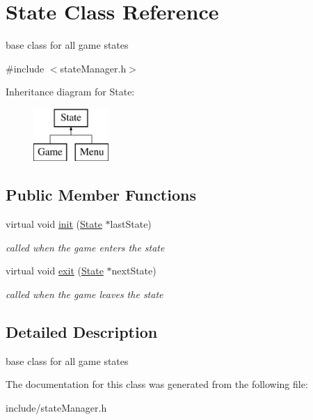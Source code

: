 \hypertarget{classState}{
\section{\-State \-Class \-Reference}
\label{d7/d97/classState}
}


base class for all game states  




{\ttfamily \#include $<$state\-Manager.\-h$>$}

\-Inheritance diagram for \-State\-:\begin{figure}[H]
\begin{center}
\leavevmode
\includegraphics[height=2.000000cm]{d7/d97/classState}
\end{center}
\end{figure}
\subsection*{\-Public \-Member \-Functions}
\begin{DoxyCompactItemize}
\item 
\hypertarget{classState_a0785fafcaa541b2567f02812d3725bc9}{
virtual void \hyperlink{classState_a0785fafcaa541b2567f02812d3725bc9}{init} (\hyperlink{classState}{\-State} $\ast$last\-State)}
\label{d7/d97/classState_a0785fafcaa541b2567f02812d3725bc9}

\begin{DoxyCompactList}\small\item\em called when the game enters the state \end{DoxyCompactList}\item 
\hypertarget{classState_a7cb1387e51f97a66f433bcf65b977af7}{
virtual void \hyperlink{classState_a7cb1387e51f97a66f433bcf65b977af7}{exit} (\hyperlink{classState}{\-State} $\ast$next\-State)}
\label{d7/d97/classState_a7cb1387e51f97a66f433bcf65b977af7}

\begin{DoxyCompactList}\small\item\em called when the game leaves the state \end{DoxyCompactList}\end{DoxyCompactItemize}


\subsection{\-Detailed \-Description}
base class for all game states 

\-The documentation for this class was generated from the following file\-:\begin{DoxyCompactItemize}
\item 
include/state\-Manager.\-h\end{DoxyCompactItemize}
